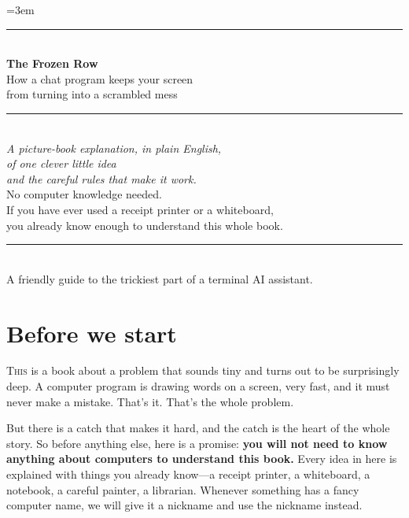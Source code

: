 \documentclass[11pt,twoside]{book}
\begin{document}
\frenchspacing
\emergencystretch=3em

\thispagestyle{empty}
\begin{titlepage}
\raggedright
\vspace*{1.1in}
{\color{rulegray}\rule{\linewidth}{1pt}}\\[10pt]
{\sffamily\bfseries\fontsize{40}{44}\selectfont\color{ink} The Frozen Row}\\[14pt]
{\sffamily\fontsize{15}{20}\selectfont\color{accent}
  How a chat program keeps your screen\\ from turning into a scrambled mess}\\[10pt]
{\color{rulegray}\rule{\linewidth}{1pt}}\\[24pt]
{\itshape\fontsize{12}{16}\selectfont
A picture-book explanation, in plain English,\\
of one clever little idea \\
and the careful rules that make it work.}\\[10pt]
\vfill
{\sffamily\small\color{accent}
No computer knowledge needed.\\
If you have ever used a receipt printer or a whiteboard,\\
you already know enough to understand this whole book.}\\[20pt]
{\color{rulegray}\rule{\linewidth}{0.5pt}}\\[6pt]
{\small A friendly guide to the trickiest part of a terminal AI assistant.}
\end{titlepage}

\frontmatter
\pagestyle{plain}

\chapter*{Before we start}

\lettrine{T}{his} is a book about a problem that sounds tiny and turns out
to be surprisingly deep. A computer program is drawing words on a screen,
very fast, and it must never make a mistake. That's it. That's the whole
problem.

But there is a catch that makes it hard, and the catch is the heart of the
whole story. So before anything else, here is a promise: \textbf{you will
not need to know anything about computers to understand this book.} Every
idea in here is explained with things you already know---a receipt
printer, a whiteboard, a notebook, a careful painter, a librarian. Whenever
something has a fancy computer name, we will give it a nickname and use the
nickname instead.
\end{document}
